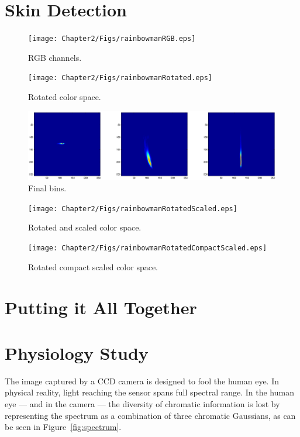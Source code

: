 \section{Skin Detection}\label{sec:SkinDetection}

\begin{figure}[h!]
  \caption{RGB channels.}
  \centering
    \texttt{[image: Chapter2/Figs/rainbowmanRGB.eps]}
\end{figure}

\begin{figure}[h!]
  \caption{Rotated color space.}
  \centering
    \texttt{[image: Chapter2/Figs/rainbowmanRotated.eps]}
\end{figure}

\begin{figure}[h!]
  \caption{Final bins.}
  \centering
    \includegraphics[width=\textwidth]{Chapter2/Figs/binsFinal2.eps}
\end{figure}

\begin{figure}[h!]
  \caption{Rotated and scaled color space.}
  \centering
    \texttt{[image: Chapter2/Figs/rainbowmanRotatedScaled.eps]}
\end{figure}

\begin{figure}[h!]
  \caption{Rotated compact scaled color space.}
  \centering
    \texttt{[image: Chapter2/Figs/rainbowmanRotatedCompactScaled.eps]}
\end{figure}

\section{Putting it All Together}\label{sec:PuttingItAllTogether}

\section{Physiology Study}\label{sec:PhysiologyStudy}

The image captured by a CCD camera is designed to fool the human eye. In physical reality, light reaching the sensor spans full spectral range. In the human eye --- and in the camera --- the diversity of chromatic information is lost by representing the spectrum as a combination of three chromatic Gaussians, as can be seen in Figure~\ref{fig:spectrum}.

